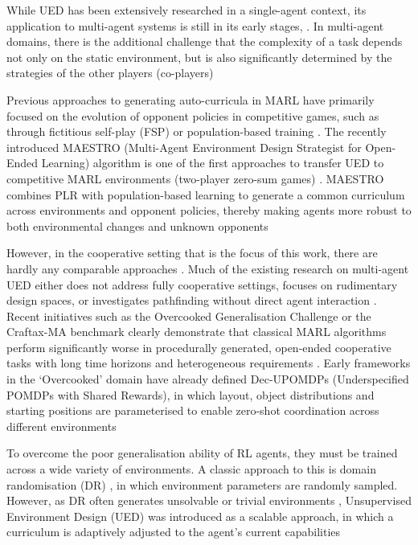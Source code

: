 While UED has been extensively researched in a single-agent context, its application to multi-agent systems is still in its early stages\cite{dennis2020, JiangPLR2021, parkerholder2023ACCEL}, . In multi-agent domains, there is the additional challenge that the complexity of a task depends not only on the static environment, but is also significantly determined by the strategies of the other players (co-players) \cite{samvelyan2023maestr}

Previous approaches to generating auto-curricula in MARL have primarily focused on the evolution of opponent policies in competitive games, such as through fictitious self-play (FSP) or population-based training \cite{samvelyan2023maestr}. The recently introduced MAESTRO (Multi-Agent Environment Design Strategist for Open-Ended Learning) algorithm is one of the first approaches to transfer UED to competitive MARL environments (two-player zero-sum games) \cite{samvelyan2023maestr}. MAESTRO combines PLR with population-based learning to generate a common curriculum across environments and opponent policies, thereby making agents more robust to both environmental changes and unknown opponents \cite{samvelyan2023maestr}

However, in the cooperative setting that is the focus of this work, there are hardly any comparable approaches \cite{ruhdorfer2025overcookedgeneralisationchallengeevaluating}. Much of the existing research on multi-agent UED either does not address fully cooperative settings, focuses on rudimentary design spaces, or investigates pathfinding without direct agent interaction \cite{ruhdorfer2025overcookedgeneralisationchallengeevaluating}. Recent initiatives such as the Overcooked Generalisation Challenge \cite{ruhdorfer2025overcookedgeneralisationchallengeevaluating} or the Craftax-MA \cite{} benchmark clearly demonstrate that classical MARL algorithms perform significantly worse in procedurally generated, open-ended cooperative tasks with long time horizons and heterogeneous requirements \cite{omari2025MACraftax}. Early frameworks in the ‘Overcooked’ domain have already defined Dec-UPOMDPs (Underspecified POMDPs with Shared Rewards), in which layout, object distributions and starting positions are parameterised to enable zero-shot coordination across different environments \cite{ruhdorfer2025overcookedgeneralisationchallengeevaluating}


To overcome the poor generalisation ability of RL agents, they must be trained across a wide variety of environments. A classic approach to this is domain randomisation (DR) \cite{tobin2017domainrandomizationtransferringdeep}, in which environment parameters are randomly sampled. However, as DR often generates unsolvable or trivial environments \cite{dennis2020}, Unsupervised Environment Design (UED) was introduced as a scalable approach, in which a curriculum is adaptively adjusted to the agent’s current capabilities \cite{ruhdorfer2025overcookedgeneralisationchallengeevaluating}





